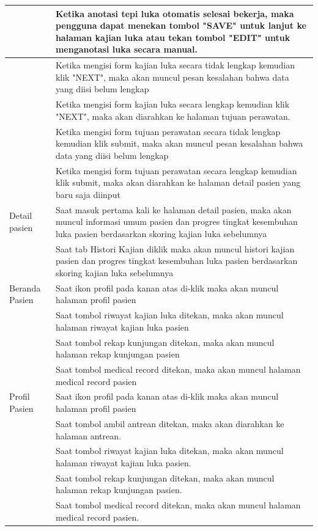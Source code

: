 \begin{enumerate}
\begin{longtable}[c]{@{} |p{4cm}|p{9.3cm}| @{}}
	\hline
	& Ketika anotasi tepi luka otomatis selesai bekerja, maka pengguna dapat menekan tombol "SAVE" untuk lanjut ke halaman kajian luka atau tekan tombol "EDIT" untuk menganotasi luka secara manual.\\
	\hline
	& Ketika mengisi form kajian luka secara tidak lengkap kemudian klik "NEXT", maka akan muncul pesan kesalahan bahwa data yang diisi belum lengkap\\
	\hline
	& Ketika mengisi form kajian luka secara lengkap kemudian klik "NEXT", maka akan diarahkan ke halaman tujuan perawatan.\\
	\hline
	& Ketika mengisi form tujuan perawatan secara tidak lengkap kemudian klik submit, maka akan muncul pesan kesalahan bahwa data yang diisi belum lengkap\\
	\hline
	& Ketika mengisi form tujuan perawatan secara lengkap kemudian klik submit, maka akan diarahkan ke halaman detail pasien yang baru saja diinput\\
	\hline
	Detail pasien & Saat masuk pertama kali ke halaman detail pasien, maka akan muncul informasi umum pasien dan progres tingkat kesembuhan luka pasien berdasarkan skoring kajian luka sebelumnya\\
	\hline
	& Saat tab Histori Kajian diklik maka akan muncul histori kajian pasien dan progres tingkat kesembuhan luka pasien berdasarkan skoring kajian luka sebelumnya\\
	\hline
	Beranda Pasien & Saat ikon profil pada kanan atas di-klik maka akan muncul halaman profil pasien\\
	\hline
	& Saat tombol riwayat kajian luka ditekan, maka akan muncul halaman riwayat kajian luka pasien\\
	\hline
	& Saat tombol rekap kunjungan ditekan, maka akan muncul halaman rekap kunjungan pasien\\
	\hline
	& Saat tombol medical record ditekan, maka akan muncul halaman medical record pasien\\
	\hline
	Profil Pasien & Saat ikon profil pada kanan atas di-klik maka akan muncul halaman profil pasien\\
	\hline
	& Saat tombol ambil antrean ditekan, maka akan diarahkan ke halaman antrean.\\
	\hline
	& Saat tombol riwayat kajian luka ditekan, maka akan muncul halaman riwayat kajian luka pasien.\\
	\hline
	& Saat tombol rekap kunjungan ditekan, maka akan muncul halaman rekap kunjungan pasien.\\
	\hline
	& Saat tombol medical record ditekan, maka akan muncul halaman medical record pasien.\\

\end{longtable}
\end{enumerate}

